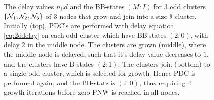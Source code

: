 \begin{figure}
\begin{tikzpicture}[on grid, scale=1]
    \end{tikzpicture}
    \caption{The delay values $n_i.d$ and the BB-states $(M:I)$ for 3 odd clusters $\{\nset_1, \nset_2, \nset_3\}$ of 3 nodes that grow and join into a size-9 cluster. Initially (top), PDC's are performed with delay equation \eqref{eq:2ddelay} on each odd cluster which have BB-states $(2:0)$, with delay $2$ in the middle node. The clusters are grown (middle), where the middle node is delayed, such that it's delay value decreases to $1$, and the clusters have B-states $(2:1)$. The clusters join (bottom) to a single odd cluster, which is selected for growth. Hence PDC is performed again, and the BB-state is $(4:0)$, thus requiring 4 growth iterations before zero PNW is reached in all nodes.}\label{fig:kbloom}
\end{figure}


